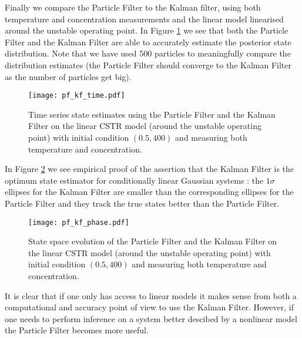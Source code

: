 Finally we compare the Particle Filter to the Kalman filter, using both temperature and concentration measurements and the linear model linearised around the unstable operating point. In Figure \ref{fig_pf_kf_time} we see that both the Particle Filter and the Kalman Filter are able to accurately estimate the posterior state distribution. Note that we have used 500 particles to meaningfully compare the distribution estimates (the Particle Filter should converge to the Kalman Filter as the number of particles get big).
\begin{figure}[H] 
\centering
\texttt{[image: pf\_kf\_time.pdf]}
\caption{Time series state estimates using the Particle Filter and the Kalman Filter on the linear CSTR model (around the unstable operating point) with initial condition $(0.5, 400)$ and measuring both temperature and concentration.}
\label{fig_pf_kf_time}
\end{figure}
In Figure \ref{fig_pf_kf_phase} we see empirical proof of the assertion that the Kalman Filter is the optimum state estimator for conditionally linear Gaussian systems \cite{shalom}: the $1\sigma$ ellipses for the Kalman Filter are smaller than the corresponding ellipses for the Particle Filter and they track the true states better than the Particle Filter. 
\begin{figure}[H] 
\centering
\texttt{[image: pf\_kf\_phase.pdf]}
\caption{State space evolution of the Particle Filter and the Kalman Filter on the linear CSTR model (around the unstable operating point) with initial condition $(0.5, 400)$ and measuring both temperature and concentration.}
\label{fig_pf_kf_phase}
\end{figure}
It is clear that if one only has access to linear models it makes sense from both a computational and accuracy point of view to use the Kalman Filter. However, if one needs to perform inference on a system better descibed by a nonlinear model the Particle Filter becomes more useful.
